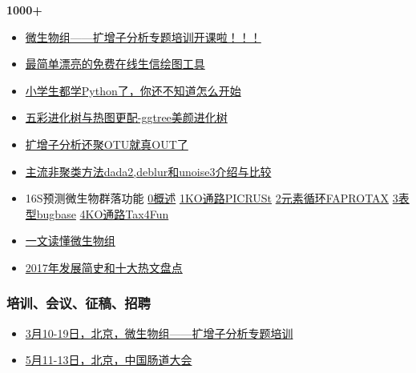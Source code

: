\documentclass[]{article}
\providecommand{\tightlist}{%
  \setlength{\itemsep}{0pt}\setlength{\parskip}{0pt}}
\numberwithin{figure}{section}
\numberwithin{table}{section}
\begin{document}
\textbf{1000+}

\begin{itemize}
\tightlist
\item
  \href{http://mp.weixin.qq.com/s/xxBC2VMpB7uz_rJFBSb5mQ}{微生物组------扩增子分析专题培训开课啦！！！}
\item
  \href{http://mp.weixin.qq.com/s/O0QAQyfxnrXlFLw268B7lg}{最简单漂亮的免费在线生信绘图工具}
\item
  \href{http://mp.weixin.qq.com/s/RaxOgjq4hyr-RNGSB-RGzg}{小学生都学Python了，你还不知道怎么开始}
\item
  \href{http://mp.weixin.qq.com/s/yWzFAS8Nk6fpTuAJzbG6nA}{五彩进化树与热图更配-ggtree美颜进化树}
\item
  \href{http://mp.weixin.qq.com/s/D3qKT7mYEg52nCfQWF75wg}{扩增子分析还聚OTU就真OUT了}
\item
  \href{http://mp.weixin.qq.com/s/hU4AavhMQcebNhBtMUg1tw}{主流非聚类方法dada2,deblur和unoise3介绍与比较}
\item
  16S预测微生物群落功能 \href{http://mp.weixin.qq.com/s/sztbvfdf9wa-3HJXc_m8TQ}{0概述} \href{https://mp.weixin.qq.com/s/LWtiwBbUCAadMZPaKKDMag}{1KO通路PICRUSt} \href{http://mp.weixin.qq.com/s/J8EwJD_PTDhqRaD7kXlK1A}{2元素循环FAPROTAX} \href{https://mp.weixin.qq.com/s/1WdysPZWo0H6NSYiNpcMUQ}{3表型bugbase} \href{http://mp.weixin.qq.com/s/dzsh44ue93xnAs7gTde7wg}{4KO通路Tax4Fun}\\
\item
  \href{https://mp.weixin.qq.com/s/KT4hJFbJFnGPQQYgQUd8fg}{一文读懂微生物组}
\item
  \href{https://mp.weixin.qq.com/s/9sUOcZTsfOXBjj03OHGy6Q}{2017年发展简史和十大热文盘点}
\end{itemize}

\hypertarget{ux57f9ux8badux4f1aux8baeux5f81ux7a3fux62dbux8058}{%
\subsubsection{培训、会议、征稿、招聘}\label{ux57f9ux8badux4f1aux8baeux5f81ux7a3fux62dbux8058}}

\begin{itemize}
\tightlist
\item
  \href{http://mp.weixin.qq.com/s/xxBC2VMpB7uz_rJFBSb5mQ}{3月10-19日，北京，微生物组------扩增子分析专题培训}
\item
  \href{http://mp.weixin.qq.com/s/b_ron-vL6n-0CDJW87l2rQ}{5月11-13日，北京，中国肠道大会}
\end{itemize}
\end{document}
